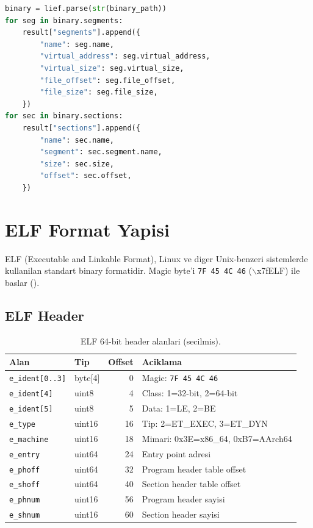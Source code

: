 \begin{lstlisting}[language=Python, caption={lief ile segment/section cikartma}]
binary = lief.parse(str(binary_path))
for seg in binary.segments:
    result["segments"].append({
        "name": seg.name,
        "virtual_address": seg.virtual_address,
        "virtual_size": seg.virtual_size,
        "file_offset": seg.file_offset,
        "file_size": seg.file_size,
    })
for sec in binary.sections:
    result["sections"].append({
        "name": sec.name,
        "segment": sec.segment.name,
        "size": sec.size,
        "offset": sec.offset,
    })
\end{lstlisting}


\section{ELF Format Yapisi}
\label{sec:elf-format}

ELF (Executable and Linkable Format), Linux ve diger Unix-benzeri sistemlerde kullanilan standart binary formatidir. Magic byte'i \texttt{7F 45 4C 46} ($\backslash$x7fELF) ile baslar ().

\subsection{ELF Header}

\begin{table}[htbp]
\centering
\begin{tabular}{llrl}
\toprule
\textbf{\color{sectioncyan}Alan} & \textbf{\color{sectioncyan}Tip} & \textbf{\color{sectioncyan}Offset} & \textbf{\color{sectioncyan}Aciklama} \\
\midrule
\texttt{e\_ident[0..3]}  & byte[4]  & 0   & Magic: \texttt{7F 45 4C 46} \\
\texttt{e\_ident[4]}     & uint8    & 4   & Class: 1=32-bit, 2=64-bit \\
\texttt{e\_ident[5]}     & uint8    & 5   & Data: 1=LE, 2=BE \\
\texttt{e\_type}         & uint16   & 16  & Tip: 2=ET\_EXEC, 3=ET\_DYN \\
\texttt{e\_machine}      & uint16   & 18  & Mimari: 0x3E=x86\_64, 0xB7=AArch64 \\
\texttt{e\_entry}        & uint64   & 24  & Entry point adresi \\
\texttt{e\_phoff}        & uint64   & 32  & Program header table offset \\
\texttt{e\_shoff}        & uint64   & 40  & Section header table offset \\
\texttt{e\_phnum}        & uint16   & 56  & Program header sayisi \\
\texttt{e\_shnum}        & uint16   & 60  & Section header sayisi \\
\bottomrule
\end{tabular}
\caption{ELF 64-bit header alanlari (secilmis).}
\label{tab:elf-header}
\end{table}

